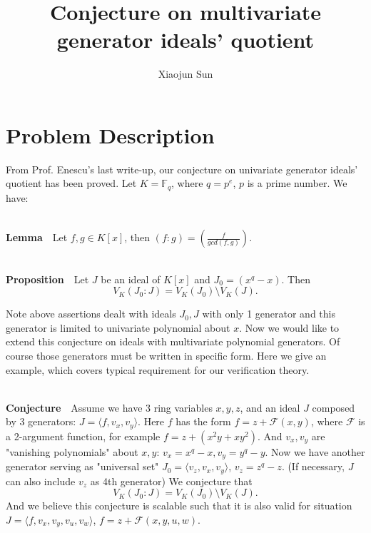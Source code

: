 \documentclass[12pt,letterpaper]{article}
\begin{document}
\title{Conjecture on multivariate generator ideals' quotient}
\author{Xiaojun Sun}
\maketitle

\section{Problem Description}
From Prof. Enescu's last write-up, our conjecture on univariate generator ideals' quotient has been
proved. Let $K = \mathbb F_q$, where $q=p^e$, $p$ is a prime number. We have:\par
\indent \\
\textbf{Lemma}\ \ Let $f,g\in K[x]$, then $(f:g) = (\frac{f}{gcd(f,g)})$.\par
\indent \\
\textbf{Proposition}\ \ Let $J$ be an ideal of $K[x]$ and $J_0 = (x^q - x)$. Then
$$V_K(J_0:J) = V_K(J_0)\setminus V_K(J).$$
\indent \par
Note above assertions dealt with ideals $J_0, J$ with only 1 generator and this generator is limited
to univariate polynomial about $x$. 
Now we would like to extend this conjecture on ideals with multivariate polynomial generators. Of course
those generators must be written in specific form. Here we give an example, which covers
typical requirement for our verification theory.\par
\indent\\
\textbf{Conjecture}\ \  Assume we have 3 ring variables $x,y,z$, and an ideal $J$ composed by 3 generators:
$J = \langle f, v_x, v_y\rangle$. Here $f$ has the form $f= z+\mathcal F(x,y)$, where $\mathcal F$
is a 2-argument function, for example $f = z+(x^2y+xy^2)$. And $v_x, v_y$ are "vanishing polynomials" about
$x, y$: $v_x = x^q - x, v_y = y^q - y$. Now we have another generator serving as "universal set"
$J_0 = \langle v_z, v_x, v_y\rangle$, $v_z = z^q - z$. (If necessary, $J$ can also include $v_z$ as 4th generator)
We conjecture that
$$V_K(J_0:J) = V_K(J_0)\setminus V_K(J).$$
And we believe this conjecture is scalable such that it is also valid for situation 
$J = \langle f, v_x,v_y,v_u,v_w\rangle$, $f = z + \mathcal F (x,y,u,w)$.
\end{document}
